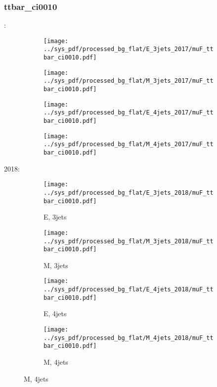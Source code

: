\documentclass{beamer}
\begin{document}
\begin{frame}
\frametitle{ttbar_ci0010}
\fontsize{5}{1}:
\begin{figure}
\centering
\begin{subfigure}[b]{0.24\textwidth}
\texttt{[image: ../sys\_pdf/processed\_bg\_flat/E\_3jets\_2017/muF\_ttbar\_ci0010.pdf]}
\end{subfigure}
\begin{subfigure}[b]{0.24\textwidth}
\texttt{[image: ../sys\_pdf/processed\_bg\_flat/M\_3jets\_2017/muF\_ttbar\_ci0010.pdf]}
\end{subfigure}
\begin{subfigure}[b]{0.24\textwidth}
\texttt{[image: ../sys\_pdf/processed\_bg\_flat/E\_4jets\_2017/muF\_ttbar\_ci0010.pdf]}
\end{subfigure}
\begin{subfigure}[b]{0.24\textwidth}
\texttt{[image: ../sys\_pdf/processed\_bg\_flat/M\_4jets\_2017/muF\_ttbar\_ci0010.pdf]}
\end{subfigure}
\end{figure}
2018:
\begin{figure}
\centering
\begin{subfigure}[b]{0.24\textwidth}
\texttt{[image: ../sys\_pdf/processed\_bg\_flat/E\_3jets\_2018/muF\_ttbar\_ci0010.pdf]}
\captionsetup{font=tiny}
\caption{E, 3jets}
\end{subfigure}
\begin{subfigure}[b]{0.24\textwidth}
\texttt{[image: ../sys\_pdf/processed\_bg\_flat/M\_3jets\_2018/muF\_ttbar\_ci0010.pdf]}
\captionsetup{font=tiny}
\caption{M, 3jets}
\end{subfigure}
\begin{subfigure}[b]{0.24\textwidth}
\texttt{[image: ../sys\_pdf/processed\_bg\_flat/E\_4jets\_2018/muF\_ttbar\_ci0010.pdf]}
\captionsetup{font=tiny}
\caption{E, 4jets}
\end{subfigure}
\begin{subfigure}[b]{0.24\textwidth}
\texttt{[image: ../sys\_pdf/processed\_bg\_flat/M\_4jets\_2018/muF\_ttbar\_ci0010.pdf]}
\captionsetup{font=tiny}
\caption{M, 4jets}
\end{subfigure}
\end{figure}
\end{frame}
\end{document}
